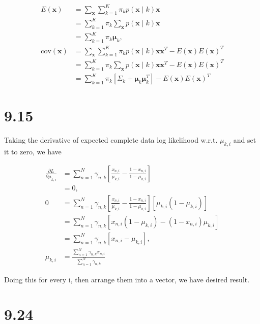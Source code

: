 \documentclass[12pt]{article}
\newcommand{\vect}[1]{\boldsymbol{#1}}
\begin{document}
\begin{align}
E(\vect{x} ) & = \sum_{\vect{x}} \sum_{k=1}^K \pi_k p(\vect{x}\mid k) \vect{x} \\
             & =  \sum_{k=1}^K \pi_k \sum_{\vect{x}} p(\vect{x}\mid k) \vect{x} \\
             & = \sum_{k=1}^K \pi_k \vect{\mu}_k, \\
\mathrm{cov}(\vect{x}) & = \sum_{\vect{x}}  \sum_{k=1}^K \pi_k p(\vect{x}\mid k)  \vect{x} \vect{x}^T - E(\vect{x} ) E(\vect{x} )^T \\
             & = \sum_{k=1}^K \pi_k \sum_{\vect{x}} p(\vect{x}\mid k) \vect{x} \vect{x}^T - E(\vect{x} ) E(\vect{x} )^T \\
             & = \sum_{k=1}^K \pi_k [ \Sigma_k + \vect{\mu}_k \vect{\mu}_k^T ] - E(\vect{x} ) E(\vect{x} )^T
\end{align}



\section{9.15} %
\label{sec:9_15}
Taking the derivative of expected complete data log likelihood w.r.t. $\mu_{k,i}$ and set it to zero, we have

\begin{align}
\frac{\partial L}{\partial \mu_{k,i} } & = \sum_{n=1}^N \gamma_{n,k} \left[ \frac{x_{n,i}}{\mu_{k,i}} - \frac{1-x_{n,i}}{1-\mu_{k,i}} \right] \\
        & = 0, \\
     0  & =  \sum_{n=1}^N \gamma_{n,k} \left[ \frac{x_{n,i}}{\mu_{k,i}} - \frac{1-x_{n,i}}{1-\mu_{k,i}} \right] [\mu_{k,i}(1-\mu_{k,i})] \\
        & = \sum_{n=1}^N \gamma_{n,k} \left[ x_{n,i} (1-\mu_{k,i}) - (1-x_{n,i})\mu_{k,i} \right] \\
        & = \sum_{n=1}^N \gamma_{n,k} \left[ x_{n,i}- \mu_{k,i} \right], \\
    \mu_{k,i} & =  \frac{\sum_{n=1}^N    \gamma_{n,k} x_{n,i}}{\sum_{n=1}^N    \gamma_{n,k}} 
\end{align}

Doing this for every i, then arrange them into a vector, we have desired result.



\section{9.24} %
\label{sec:9_24}
\end{document}
